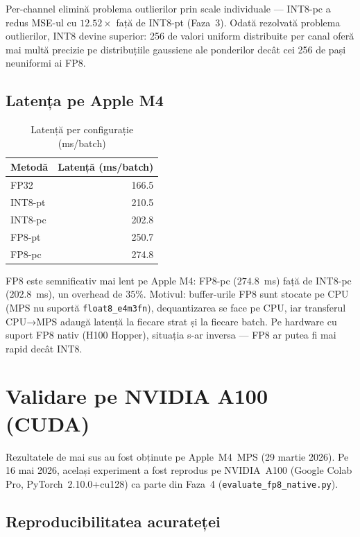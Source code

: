 \documentclass[12pt,a4paper]{article}
\begin{document}
Per-channel elimină problema outlierilor prin scale individuale ---
INT8-pc a redus MSE-ul cu $12.52\times$ față de INT8-pt (Faza~3).
Odată rezolvată problema outlierilor, INT8 devine superior: 256 de
valori uniform distribuite per canal oferă mai multă precizie pe
distribuțiile gaussiene ale ponderilor decât cei 256 de pași neuniformi
ai FP8.

\subsection{Latența pe Apple M4}

\begin{table}[H]
  \centering
  \caption{Latență per configurație (ms/batch)}
  \begin{tabular}{lr}
    \toprule
    \textbf{Metodă} & \textbf{Latență (ms/batch)} \\
    \midrule
    FP32    & 166.5 \\
    INT8-pt & 210.5 \\
    INT8-pc & 202.8 \\
    FP8-pt  & 250.7 \\
    FP8-pc  & 274.8 \\
    \bottomrule
  \end{tabular}
  \label{tab:latency}
\end{table}

FP8 este semnificativ mai lent pe Apple M4: FP8-pc ($274.8$~ms) față de
INT8-pc ($202.8$~ms), un overhead de $35\%$. Motivul: buffer-urile FP8
sunt stocate pe CPU (MPS nu suportă \texttt{float8\_e4m3fn}), dequantizarea
se face pe CPU, iar transferul CPU→MPS adaugă latență la fiecare strat
și la fiecare batch. Pe hardware cu suport FP8 nativ (H100 Hopper),
situația s-ar inversa --- FP8 ar putea fi mai rapid decât INT8.

\section{Validare pe NVIDIA A100 (CUDA)}

Rezultatele de mai sus au fost obținute pe Apple~M4~MPS (29 martie 2026).
Pe 16 mai 2026, același experiment a fost reprodus pe NVIDIA~A100 (Google
Colab Pro, PyTorch~2.10.0+cu128) ca parte din Faza~4 (\texttt{evaluate\_fp8\_native.py}).

\subsection{Reproducibilitatea acurateței}
\end{document}
